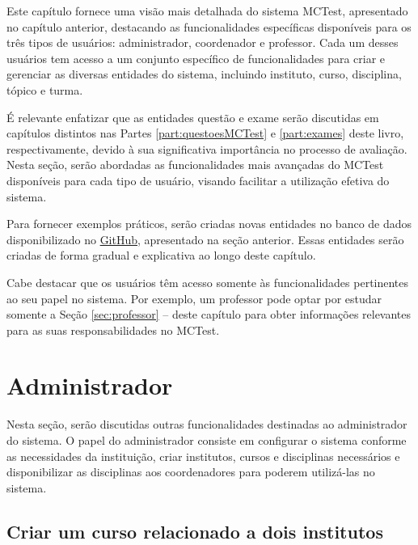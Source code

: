 \label{ch:metodosBasicos}

Este capítulo fornece uma visão mais detalhada do sistema MCTest, apresentado no capítulo anterior, destacando as funcionalidades específicas disponíveis para os três tipos de usuários: administrador, coordenador e professor. Cada um desses usuários tem acesso a um conjunto específico de funcionalidades para criar e gerenciar as diversas entidades do sistema, incluindo instituto, curso, disciplina, tópico e turma.

É relevante enfatizar que as entidades questão e exame serão discutidas em capítulos distintos nas Partes \ref{part:questoesMCTest} e \ref{part:exames} deste livro, respectivamente, devido à sua significativa importância no processo de avaliação. Nesta seção, serão abordadas as funcionalidades mais avançadas do MCTest disponíveis para cada tipo de usuário, visando facilitar a utilização efetiva do sistema.

Para fornecer exemplos práticos, serão criadas novas entidades no banco de dados disponibilizado no \href{https://github.com/fzampirolli/mctest}{GitHub}, apresentado na seção anterior. Essas entidades serão criadas de forma gradual e explicativa ao longo deste capítulo.

Cabe destacar que os usuários têm acesso somente às funcionalidades pertinentes ao seu papel no sistema. Por exemplo, um professor pode optar por estudar somente a Seção \ref{sec:professor} --  deste capítulo para obter informações relevantes para as suas responsabilidades no MCTest.

\section{Administrador}

Nesta seção, serão discutidas outras funcionalidades destinadas ao administrador do sistema. O papel do administrador consiste em configurar o sistema conforme as necessidades da instituição, criar institutos, cursos e disciplinas necessários e disponibilizar as disciplinas aos coordenadores para poderem utilizá-las no sistema.

\subsection{Criar um curso relacionado a dois institutos}

